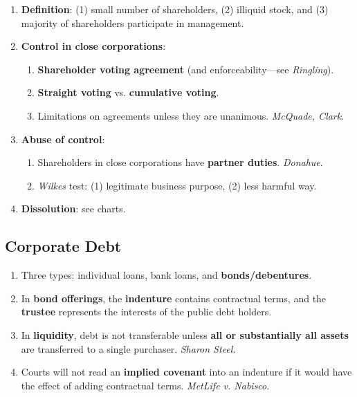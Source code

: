 \begin{enumerate}
    \item \textbf{Definition}: (1) small number of shareholders, (2) illiquid 
    stock, and (3) majority of shareholders participate in management. 
    \item \textbf{Control in close corporations}:
    \begin{enumerate}
        \item \textbf{Shareholder voting agreement} (and enforceability---see 
        \emph{Ringling}).
        \item \textbf{Straight voting} vs. \textbf{cumulative voting}.
        \item Limitations on agreements unless they are unanimous. 
        \emph{McQuade, Clark}.
    \end{enumerate}
    \item \textbf{Abuse of control}:
    \begin{enumerate}
        \item Shareholders in close corporations have \textbf{partner duties}. 
        \emph{Donahue}.
        \item \emph{Wilkes} test: (1) legitimate business purpose, (2) less 
        harmful way.
    \end{enumerate}
    \item \textbf{Dissolution}: see charts.
\end{enumerate}

\newpage

\subsection{Corporate Debt}

\begin{enumerate}
    \item Three types: individual loans, bank loans, and 
    \textbf{bonds/debentures}.
    \item In \textbf{bond offerings}, the \textbf{indenture} contains 
    contractual terms, and the \textbf{trustee} represents the interests of 
    the public debt holders.
    \item In \textbf{liquidity}, debt is not transferable unless \textbf{all 
    or substantially all assets} are transferred to a single purchaser. 
    \emph{Sharon Steel}.
    \item Courts will not read an \textbf{implied covenant} into an indenture 
    if it would have the effect of adding contractual terms. \emph{MetLife v. 
    Nabisco}.
\end{enumerate}
